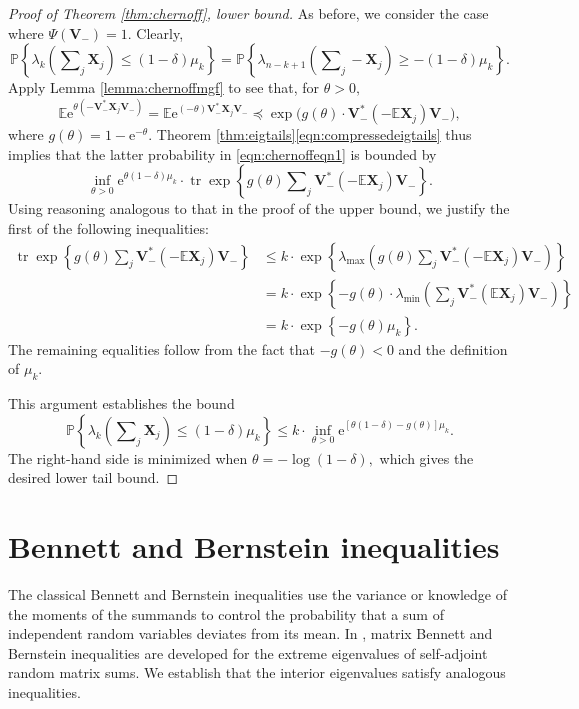 \documentclass[11pt,letterpaper,twoside,reqno,nosumlimits]{amsart}
\renewcommand{\star}{*}
\newcommand{\mat}[1]{\ensuremath{\bm{#1}}} %
\newcommand{\e}{\ensuremath{\mathrm{e}}}
\newcommand{\E}{\ensuremath{\mathbb{E}}}
\newcommand{\Prob}[1]{\ensuremath{\mathbb{P}\left\{#1\right\}}}
\newcommand{\randcon}{\ensuremath{\Psi}}
\newcommand{\lambdamax}[1]{\ensuremath{\lambda_{\mathrm{max}}\left(#1\right)}}
\newcommand{\lambdamin}[1]{\ensuremath{\lambda_{\mathrm{min}}\left(#1\right)}}
\DeclareMathOperator{\tr}{tr}
\newcommand{\trexp}[1]{\ensuremath{\tr\exp\left\{#1\right\}}}
\theoremstyle{remark}
\numberwithin{equation}{section}
\numberwithin{thm}{section}
\numberwithin{prop}{section}
\numberwithin{defn}{section}
\numberwithin{remark}{section}
\begin{document}
\begin{proof}[Proof of Theorem \ref{thm:chernoff}, lower bound]
As before, we consider the case where $\randcon(\mat{V}_{-}) = 1.$ Clearly,
\begin{equation}
 \Prob{ \lambda_k\left(\sum\nolimits_j \mat{X}_j \right) \leq (1-\delta)\mu_k } = \Prob{ \lambda_{n-k+1} \left(\sum\nolimits_j -\mat{X}_j \right) \geq -(1-\delta)\mu_k }.
 \label{eqn:chernoffeqn1}
\end{equation}
Apply Lemma \ref{lemma:chernoffmgf} to see that, for $\theta > 0,$
\[
\E \e^{\theta (-\mat{V}^\star_- \mat{X}_j \mat{V}_-)} = \E \e^{(-\theta)\mat{V}^\star_- \mat{X}_j \mat{V}_-} \preceq \exp\big(g(\theta)\cdot \mat{V}^\star_-(-\E\mat{X}_j)\mat{V}_-\big), 
\]
where $g(\theta) = 1-\e^{-\theta}.$  
Theorem \ref{thm:eigtails}\eqref{eqn:compressedeigtails} thus implies that the latter probability in \eqref{eqn:chernoffeqn1} is bounded by
\[
  \inf_{\theta > 0} \e^{\theta(1-\delta)\mu_k}\cdot \trexp{ g(\theta) \sum\nolimits_j\mat{V}_{-}^\star (- \E\mat{X}_j) \mat{V}_{-} }.
\]
Using reasoning analogous to that in the proof of the upper bound, we justify the first of the following inequalities:
\begin{align*}
\trexp{ g(\theta) \sum\nolimits_j\mat{V}_{-}^\star (-\E \mat{X}_j) \mat{V}_{-}} & \leq k \cdot \exp\left\{ \lambdamax{ g(\theta)  \sum\nolimits_j\mat{V}_{-}^\star (-\E \mat{X}_j) \mat{V}_{-}} \right\} \\
& = k \cdot \exp\left\{ -g(\theta) \cdot \lambdamin{\sum\nolimits_j \mat{V}_{-}^\star (\E \mat{X}_j) \mat{V}_{-}} \right\} \\
& = k \cdot \exp\left\{ -g(\theta) \mu_k \right\}.
\end{align*}
The remaining equalities follow from the fact that $-g(\theta) <0$ and the definition of $\mu_k.$

This argument establishes the bound
\[
\Prob{\lambda_k\left(\sum\nolimits_j \mat{X}_j \right) \leq (1 - \delta)\mu_k} \leq k \cdot \inf_{\theta > 0} \e^{[\theta(1 - \delta) - g(\theta)]\mu_k}.
\] 
The right-hand side is minimized when $\theta = -\log(1-\delta),$ which gives the desired lower tail bound.
\end{proof}


\section{Bennett and Bernstein inequalities}
\label{sec:bernsteinbounds}

The classical Bennett and Bernstein inequalities use the variance or knowledge of the moments of the summands to control the probability that a sum of independent random variables deviates from its mean. In \cite{T10a}, matrix Bennett and Bernstein inequalities are developed for the extreme eigenvalues of self-adjoint random matrix sums. We establish that the interior eigenvalues satisfy analogous inequalities.
\end{document}
